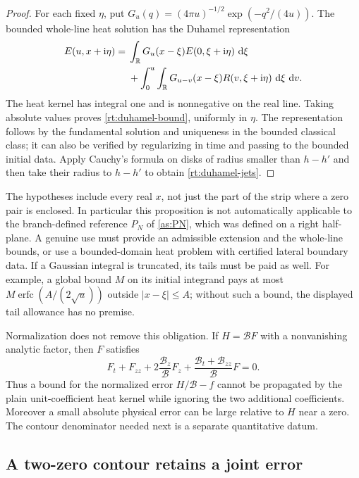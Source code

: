 \begin{proof}
For each fixed $\eta$, put
$G_u(q)=(4\pi u)^{-1/2}\exp(-q^2/(4u))$.  The bounded whole-line
heat solution has the Duhamel representation
\begin{align*}
 E(u,x+\mathrm i\eta)={}&\int_{\mathbb R}G_u(x-\xi)E(0,\xi+\mathrm i\eta)\,\,\mathrm d\xi\\
 &+\int_0^u\int_{\mathbb R}G_{u-v}(x-\xi)
                      R(v,\xi+\mathrm i\eta)\,\,\mathrm d\xi\,\,\mathrm d v.
\end{align*}
The heat kernel has integral one and is nonnegative on the real line.
Taking absolute values proves \eqref{rt:duhamel-bound}, uniformly in
$\eta$.  The representation follows by the fundamental solution and
uniqueness in the bounded classical class; it can also be verified by
regularizing in time and passing to the bounded initial data.  Apply
Cauchy's formula on disks of radius smaller than $h-h'$ and then take
their radius to $h-h'$ to obtain \eqref{rt:duhamel-jets}.
\end{proof}

The hypotheses include every real $x$, not just the part of the strip
where a zero pair is enclosed.  In particular this proposition is not
automatically applicable to the branch-defined reference $P_N$ of
\eqref{as:PN}, which was defined on a right half-plane.  A genuine use
must provide an admissible extension and the whole-line bounds, or use
a bounded-domain heat problem with certified lateral boundary data.
If a Gaussian integral is truncated, its tails must be paid as well.
For example, a global bound $M$ on its initial integrand pays at most
$M\operatorname{erfc}(A/(2\sqrt u))$ outside $|x-\xi|\le A$;
without such a bound, the displayed tail allowance has no premise.

Normalization does not remove this obligation.  If $H=\mathcal B F$
with a nonvanishing analytic factor, then $F$ satisfies
\begin{equation}
 F_t+F_{zz}+2\frac{\mathcal B_z}{\mathcal B}F_z
       +\frac{\mathcal B_t+\mathcal B_{zz}}{\mathcal B}F=0.
 \label{rt:normalized-equation}
\end{equation}
Thus a bound for the normalized error $H/\mathcal B-f$ cannot be
propagated by the plain unit-coefficient heat kernel while ignoring
the two additional coefficients.  Moreover a small absolute physical
error can be large relative to $H$ near a zero.  The contour denominator
needed next is a separate quantitative datum.

\subsection{A two-zero contour retains a joint error}

